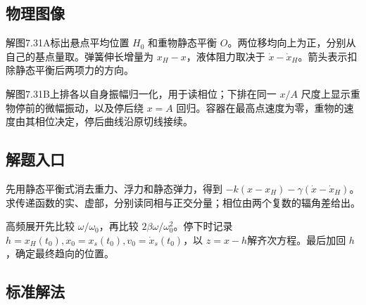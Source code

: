 \documentclass[UTF8,fontset=fandol,a4paper,11pt]{ctexart}
\begin{document}
\subsection*{物理图像}

解图7.31A标出悬点平均位置 $H_0$ 和重物静态平衡 $O$。两位移均向上为正，分别从自己的基点量取。弹簧伸长增量为 $x_H-x$，液体阻力取决于 $\dot x-\dot x_H$。箭头表示扣除静态平衡后两项力的方向。

解图7.31B上排各以自身振幅归一化，用于读相位；下排在同一 $x/A$ 尺度上显示重物停前的微幅振动，以及停后绕 $x=A$ 回归。容器在最高点速度为零，重物的速度由其相位决定，停后曲线沿原切线接续。




\subsection*{解题入口}

先用静态平衡式消去重力、浮力和静态弹力，得到 $-k(x-x_H)-\gamma(\dot x-\dot x_H)$。求传递函数的实、虚部，分别读同相与正交分量；相位由两个复数的辐角差给出。

高频展开先比较 $\omega/\omega_0$，再比较 $2\beta\omega/\omega_0^2$。停下时记录 $h=x_H(t_0),x_0=x_s(t_0),v_0=\dot x_s(t_0)$，以 $z=x-h$解齐次方程。最后加回 $h$，确定最终趋向的位置。



\subsection*{标准解法}
\end{document}
